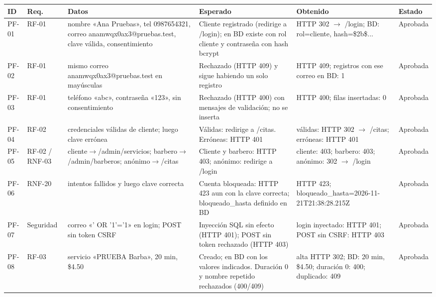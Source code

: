 \documentclass[12pt,a4paper,oneside]{article}
\begin{document}
{\footnotesize\setlength{\tabcolsep}{3pt}
\begin{longtable}{|>{\raggedright\arraybackslash}p{1.1cm}|>{\raggedright\arraybackslash}p{1.7cm}|>{\raggedright\arraybackslash}p{3.3cm}|>{\raggedright\arraybackslash}p{3.4cm}|>{\raggedright\arraybackslash}p{3.8cm}|>{\raggedright\arraybackslash}p{1.5cm}|}
\hline \textbf{ID} & \textbf{Req.} & \textbf{Datos} & \textbf{Esperado} & \textbf{Obtenido} & \textbf{Estado}\\\hline\endhead
PF-01 & RF-01 & nombre «Ana Pruebas», tel 0987654321, correo anamwqx0ax3@\allowbreak pruebas.test, clave válida, consentimiento & Cliente registrado (redirige a /login); en BD existe con rol cliente y contraseña con hash bcrypt & HTTP 302 $\rightarrow$ /login; BD: rol=cliente, hash=\$2b\$... & Aprobada \\ \hline
PF-02 & RF-01 & mismo correo anamwqx0ax3@\allowbreak pruebas.test en mayúsculas & Rechazado (HTTP 409) y sigue habiendo un solo registro & HTTP 409; registros con ese correo en BD: 1 & Aprobada \\ \hline
PF-03 & RF-01 & teléfono «abc», contraseña «123», sin consentimiento & Rechazado (HTTP 400) con mensajes de validación; no se inserta & HTTP 400; filas insertadas: 0 & Aprobada \\ \hline
PF-04 & RF-02 & credenciales válidas de cliente; luego clave errónea & Válidas: redirige a /citas. Erróneas: HTTP 401 & válidas: HTTP 302 $\rightarrow$ /citas; erróneas: HTTP 401 & Aprobada \\ \hline
PF-05 & RF-02 / RNF-03 & cliente$\rightarrow$\allowbreak/admin/\allowbreak servicios; barbero$\rightarrow$\allowbreak/admin/\allowbreak barberos; anónimo$\rightarrow$/citas & Cliente y barbero: HTTP 403; anónimo: redirige a /login & cliente: 403; barbero: 403; anónimo: 302 $\rightarrow$ /login & Aprobada \\ \hline
PF-06 & RNF-20 & 5 intentos fallidos y luego clave correcta & Cuenta bloqueada: HTTP 423 aun con la clave correcta; bloqueado\_hasta definido en BD & HTTP 423; bloqueado\_hasta=2026-11-21T21:38:28.215Z & Aprobada \\ \hline
PF-07 & Seguridad & correo «' OR '1'='1» en login; POST sin token CSRF & Inyección SQL sin efecto (HTTP 401); POST sin token rechazado (HTTP 403) & login inyectado: HTTP 401; POST sin CSRF: HTTP 403 & Aprobada \\ \hline
PF-08 & RF-03 & servicio «PRUEBA Barba», 20 min, \$4.50 & Creado; en BD con los valores indicados. Duración 0 y nombre repetido rechazados (400/409) & alta HTTP 302; BD: 20 min, \$4.50; duración 0: 400; duplicado: 409 & Aprobada \\ \hline

\end{longtable}}
\end{document}
